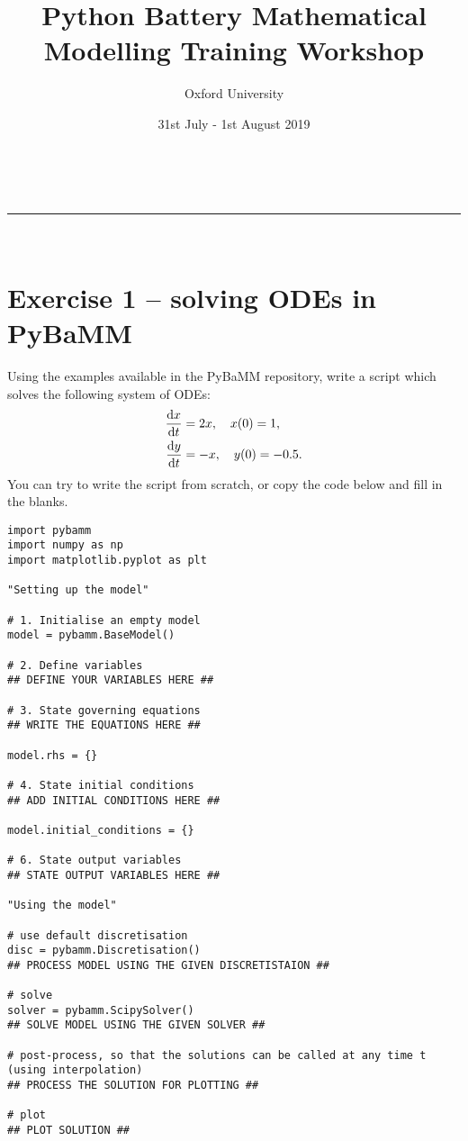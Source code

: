 \documentclass[a4paper,11pt]{article}
\makeatletter
\newcommand{\linia}{\rule{\linewidth}{0.5pt}}
\renewcommand{\maketitle}{
\begin{center}
\vspace{2ex}
{\huge \textsc{\@title}}
\vspace{1ex}
\\
\linia\\
\@author \hfill \@date
\vspace{4ex}
\end{center}
}
\makeatother
\begin{document}
\title{\textbf{P}ython \textbf{Ba}ttery \textbf{M}athematical \textbf{M}odelling Training Workshop}

\author{Oxford University}

\date{31st July - 1st August 2019}

\maketitle

\section*{Exercise 1 -- solving ODEs in PyBaMM}

Using the examples available in the PyBaMM repository, write a script which solves the following system of ODEs:
\begin{align*}
  \dv{x}{t} &= 2x, \quad x(0) = 1, \\
  \dv{y}{t} &= -x, \quad y(0) = -0.5.
\end{align*}
You can try to write the script from scratch, or copy the code below and fill in the blanks.


\begin{lstlisting}[label={Ex1},caption=Solving ODEs script]
import pybamm
import numpy as np
import matplotlib.pyplot as plt

"Setting up the model"

# 1. Initialise an empty model
model = pybamm.BaseModel()

# 2. Define variables
## DEFINE YOUR VARIABLES HERE ##

# 3. State governing equations
## WRITE THE EQUATIONS HERE ##

model.rhs = {}

# 4. State initial conditions
## ADD INITIAL CONDITIONS HERE ##

model.initial_conditions = {}

# 6. State output variables
## STATE OUTPUT VARIABLES HERE ##

"Using the model"

# use default discretisation
disc = pybamm.Discretisation()
## PROCESS MODEL USING THE GIVEN DISCRETISTAION ##

# solve
solver = pybamm.ScipySolver()
## SOLVE MODEL USING THE GIVEN SOLVER ##

# post-process, so that the solutions can be called at any time t (using interpolation)
## PROCESS THE SOLUTION FOR PLOTTING ##

# plot
## PLOT SOLUTION ##
\end{lstlisting}
\end{document}
